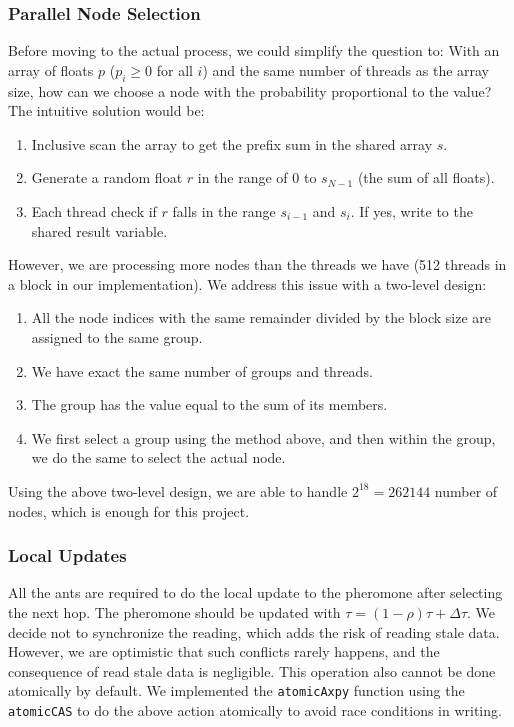 \documentclass{article}
\begin{document}
\subsubsection{Parallel Node Selection}
    Before moving to the actual process, we could simplify the question to: With an array of floats $p$ ($p_i\geq 0$ for all $i$) and the same number of threads as the array size, how can we choose a node with the probability proportional to the value? The intuitive solution would be:
    \begin{enumerate}
        \item Inclusive scan the array to get the prefix sum in the shared array $s$.
        \item Generate a random float $r$ in the range of 0 to $s_{N-1}$ (the sum of all floats).
        \item Each thread check if $r$ falls in the range $s_{i-1}$ and $s_i$. If yes, write to the shared result variable.
    \end{enumerate}
    However, we are processing more nodes than the threads we have (512 threads in a block in our implementation). We address this issue with a two-level design:
    \begin{enumerate}
        \item All the node indices with the same remainder divided by the block size are assigned to the same group.
        \item We have exact the same number of groups and threads.
        \item The group has the value equal to the sum of its members.
        \item We first select a group using the method above, and then within the group, we do the same to select the actual node.
    \end{enumerate}
    Using the above two-level design, we are able to handle $2^{18} = 262144$ number of nodes, which is enough for this project.
\subsubsection{Local Updates}
    All the ants are required to do the local update to the pheromone after selecting the next hop. The pheromone should be updated with $\tau = (1-\rho)\tau + \Delta\tau$. We decide not to synchronize the reading, which adds the risk of reading stale data. However, we are optimistic that such conflicts rarely happens, and the consequence of read stale data is negligible. This operation also cannot be done atomically by default. We implemented the \texttt{atomicAxpy} function using the \texttt{atomicCAS} to do the above action atomically to avoid race conditions in writing. 
\end{document}
